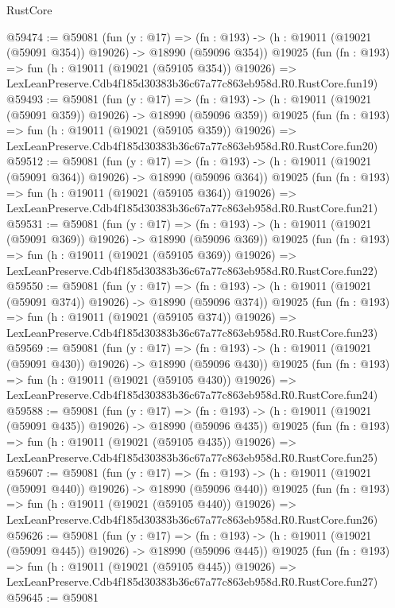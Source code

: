 \begin{lexlean}{RustCore}
\begin{coremodule}
@59474 := @59081
    (fun (y : @17) =>
    (fn : @193) -> (h : @19011 (@19021 (@59091 @354)) @19026) -> @18990 (@59096 @354))
    @19025
    (fun (fn : @193) =>
    fun (h : @19011 (@19021 (@59105 @354)) @19026) =>
    LexLeanPreserve.Cdb4f185d30383b36c67a77c863eb958d.R0.RustCore.fun19)
@59493 := @59081
    (fun (y : @17) =>
    (fn : @193) -> (h : @19011 (@19021 (@59091 @359)) @19026) -> @18990 (@59096 @359))
    @19025
    (fun (fn : @193) =>
    fun (h : @19011 (@19021 (@59105 @359)) @19026) =>
    LexLeanPreserve.Cdb4f185d30383b36c67a77c863eb958d.R0.RustCore.fun20)
@59512 := @59081
    (fun (y : @17) =>
    (fn : @193) -> (h : @19011 (@19021 (@59091 @364)) @19026) -> @18990 (@59096 @364))
    @19025
    (fun (fn : @193) =>
    fun (h : @19011 (@19021 (@59105 @364)) @19026) =>
    LexLeanPreserve.Cdb4f185d30383b36c67a77c863eb958d.R0.RustCore.fun21)
@59531 := @59081
    (fun (y : @17) =>
    (fn : @193) -> (h : @19011 (@19021 (@59091 @369)) @19026) -> @18990 (@59096 @369))
    @19025
    (fun (fn : @193) =>
    fun (h : @19011 (@19021 (@59105 @369)) @19026) =>
    LexLeanPreserve.Cdb4f185d30383b36c67a77c863eb958d.R0.RustCore.fun22)
@59550 := @59081
    (fun (y : @17) =>
    (fn : @193) -> (h : @19011 (@19021 (@59091 @374)) @19026) -> @18990 (@59096 @374))
    @19025
    (fun (fn : @193) =>
    fun (h : @19011 (@19021 (@59105 @374)) @19026) =>
    LexLeanPreserve.Cdb4f185d30383b36c67a77c863eb958d.R0.RustCore.fun23)
@59569 := @59081
    (fun (y : @17) =>
    (fn : @193) -> (h : @19011 (@19021 (@59091 @430)) @19026) -> @18990 (@59096 @430))
    @19025
    (fun (fn : @193) =>
    fun (h : @19011 (@19021 (@59105 @430)) @19026) =>
    LexLeanPreserve.Cdb4f185d30383b36c67a77c863eb958d.R0.RustCore.fun24)
@59588 := @59081
    (fun (y : @17) =>
    (fn : @193) -> (h : @19011 (@19021 (@59091 @435)) @19026) -> @18990 (@59096 @435))
    @19025
    (fun (fn : @193) =>
    fun (h : @19011 (@19021 (@59105 @435)) @19026) =>
    LexLeanPreserve.Cdb4f185d30383b36c67a77c863eb958d.R0.RustCore.fun25)
@59607 := @59081
    (fun (y : @17) =>
    (fn : @193) -> (h : @19011 (@19021 (@59091 @440)) @19026) -> @18990 (@59096 @440))
    @19025
    (fun (fn : @193) =>
    fun (h : @19011 (@19021 (@59105 @440)) @19026) =>
    LexLeanPreserve.Cdb4f185d30383b36c67a77c863eb958d.R0.RustCore.fun26)
@59626 := @59081
    (fun (y : @17) =>
    (fn : @193) -> (h : @19011 (@19021 (@59091 @445)) @19026) -> @18990 (@59096 @445))
    @19025
    (fun (fn : @193) =>
    fun (h : @19011 (@19021 (@59105 @445)) @19026) =>
    LexLeanPreserve.Cdb4f185d30383b36c67a77c863eb958d.R0.RustCore.fun27)
@59645 := @59081

\end{coremodule}
\end{lexlean}
